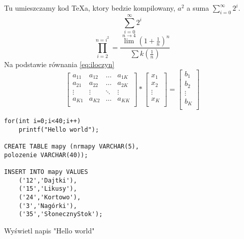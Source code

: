 \documentclass{article}
\begin{document}
Tu umieszczamy kod TeXa, ktory bedzie kompilowany, $a^2$ a suma $\sum_{i=0}^{\infty}{2^i}$.
\begin{displaymath}
	\sum_{i=0}^{\infty}{2^i}
\end{displaymath}
\begin{equation}
\label{eq:iloczyn}
\prod^{n=i^2}_{i=2}=\frac{\lim^{n\rightarrow4}(1+\frac{1}{n})^n}{\sum k (\frac{1}{n})}
\end{equation}
Na podstawie równania \ref{eq:iloczyn}
\begin{equation}
\left[
\begin{array}{cccc}
a_{11} & a_{12} & \ldots & a_{1K} \\
a_{21} & a_{22} & \ldots & a_{2K} \\
\vdots & \vdots & \ddots & \vdots \\
a_{K1} & a_{K2} & \ldots & a_{KK} \\
\end{array}
\right]
*
\left[
\begin{array}{c}
x_1 \\
x_2 \\
\vdots \\
x_K \\
\end{array}
\right]
=
\left[
\begin{array}{c}
b_1 \\
b_2 \\
\vdots \\
b_K \\
\end{array}
\right]
\end{equation}
\begin{verbatim}
for(int i=0;i<40;i++)
	printf("Hello world");
	
CREATE TABLE mapy (nrmapy VARCHAR(5),
polozenie VARCHAR(40));

INSERT INTO mapy VALUES
	('12','Dajtki'),
	('15','Likusy'),
	('24','Kortowo'),
	('3','Nagórki'),
	('35','SłonecznyStok');
\end{verbatim}

\begin{algorithmic}
	\item{Wyświetl napis "Hello world"}
\ENDFOR
\end{algorithmic}
\end{document}
